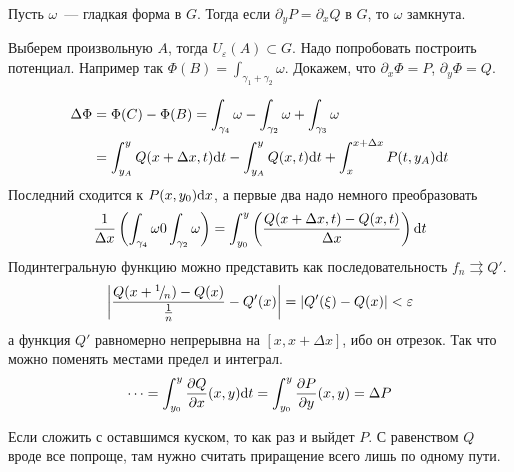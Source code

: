 \documentclass[12pt,timbord]{../../../notes}
\begin{document}
\begin{thrm}\label{thrm:lineint::closforms::suffdiff}
  Пусть $\omega$~--- гладкая форма в $G$. Тогда если $\partial_y P = \partial_x Q$ в $G$, то
  $\omega$ замкнута.  
\end{thrm}
\begin{ittproof}
  Выберем произвольную $A$, тогда $U_\varepsilon(A) \subset G$. Надо попробовать построить
  потенциал. Например так $\Phi(B) = \int_{\gamma_1 + \gamma_2} \omega$. 
  Докажем, что $\partial_x \Phi = P$, $\partial_y \Phi = Q$.

  \begin{minipage}{0.48\linewidth}
  \end{minipage}\hfill
  \begin{minipage}{0.48\linewidth}
    \[
      \begin{split}
        \Delta \Phi &= \Phi(C)-\Phi(B) = \int_{\gamma_4} \omega - \int_{\gamma_2} \omega +
        \int_{\gamma_3} \omega \\
        &= \int_{y_A}^y Q(x+\Delta x, t) \mathrm{d} t 
        - \int_{y_A}^y Q(x, t) \mathrm{d} t + \int_{x}^{x+\Delta x} P(t, y_A) \mathrm{d} t
      \end{split}
    \]
    Последний сходится к $P(x,y_0)\mathrm{d} x$, а первые два надо немного преобразовать
    \[
      \frac{1}{\Delta x} \left(\int_{\gamma_4} \omega 0 \int_{\gamma_2} \omega \right)
      = \int_{y_0}^y \left(\frac{Q(x+\Delta x,t ) - Q(x,t)}{\Delta x}\right) \mathrm{d} t
    \]
    Подинтегральную функцию можно представить как последовательность $f_n \rightrightarrows Q'$.
    \[
      \left| \frac{Q(x+{}^{1}\!/_{\!n} )- Q(x)}{\frac 1 n} - Q'(x)\right| = |Q'(\xi) - Q(x) |
      <\varepsilon
    \]
    а функция $Q'$ равномерно непрерывна на $[x, x+ \Delta x]$, ибо он отрезок. Так что можно
    поменять местами предел и интеграл.
    \[
      \cdots = \int_{y_0}^y \frac{\partial Q}{\partial x}(x,y) \mathrm{d} t = \int_{y_0}^y \frac{\partial P}{\partial y} (x,y) = \Delta P
    \]
  \end{minipage}
    Если сложить с оставшимся куском, то как раз и выйдет $P$. С равенством $Q$ вроде все
    попроще, там нужно считать приращение всего лишь по одному пути.
\end{ittproof}
\end{document}
